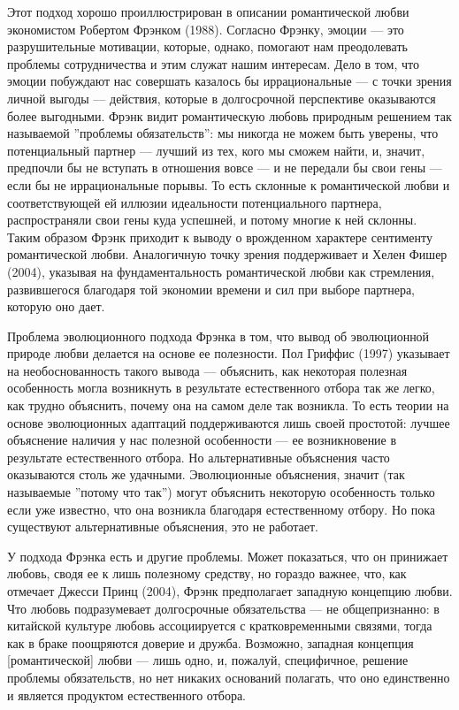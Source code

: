 \documentclass[11pt]{book}
\begin{document}
Этот подход хорошо проиллюстрирован в описании романтической любви экономистом Робертом Фрэнком (1988). Согласно Фрэнку, эмоции --- это разрушительные мотивации, которые, однако, помогают нам преодолевать проблемы сотрудничества и этим служат нашим интересам. Дело в том, что эмоции побуждают нас совершать казалось бы иррациональные --- с точки зрения личной выгоды --- действия, которые в долгосрочной перспективе оказываются более выгодными. Фрэнк видит романтическую любовь природным решением так называемой ''проблемы обязательств'': мы никогда не можем быть уверены, что потенциальный партнер --- лучший из тех, кого мы сможем найти, и, значит, предпочли бы не вступать в отношения вовсе --- и не передали бы свои гены --- если бы не иррациональные порывы. То есть склонные к романтической любви и соответствующей ей иллюзии идеальности потенциального партнера, распространяли свои гены куда успешней, и потому многие к ней склонны. Таким образом Фрэнк приходит к выводу о врожденном характере сентименту романтической любви. Аналогичную точку зрения поддерживает и Хелен Фишер (2004), указывая на фундаментальность романтической любви как стремления, развившегося благодаря той экономии времени и сил при выборе партнера, которую оно дает.

Проблема эволюционного подхода Фрэнка в том, что вывод об эволюционной природе любви делается на основе ее полезности. Пол Гриффис (1997) указывает на необоснованность такого вывода --- объяснить, как некоторая полезная особенность могла возникнуть в результате естественного отбора так же легко, как трудно объяснить, почему она на самом деле так возникла. То есть теории на основе эволюционных адаптаций поддерживаются лишь своей простотой: лучшее объяснение наличия у нас полезной особенности --- ее возникновение в результате естественного отбора. Но альтернативные объяснения часто оказываются столь же удачными. Эволюционные объяснения, значит (так называемые ''потому что так'') могут объяснить некоторую особенность только если уже известно, что она возникла благодаря естественному отбору. Но пока существуют альтернативные объяснения, это не работает.

У подхода Фрэнка есть и другие проблемы. Может показаться, что он принижает любовь, сводя ее к лишь полезному средству, но гораздо важнее, что, как отмечает Джесси Принц (2004), Фрэнк предполагает западную концепцию любви. Что любовь подразумевает долгосрочные обязательства --- не общепризнанно: в китайской культуре любовь ассоциируется с кратковременными связями, тогда как в браке поощряются доверие и дружба. Возможно, западная концепция [романтической] любви --- лишь одно, и, пожалуй, специфичное, решение проблемы обязательств, но нет никаких оснований полагать, что оно единственно и является продуктом естественного отбора.
\end{document}

